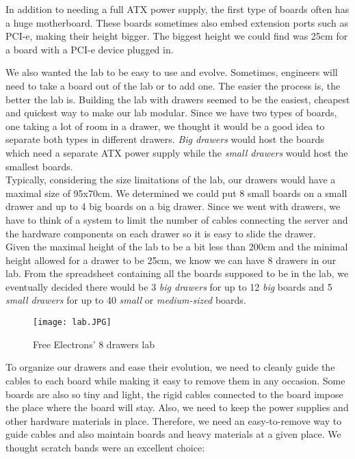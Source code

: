 In addition to needing a full ATX power supply, the first type of boards often has a huge motherboard. These boards sometimes also embed extension ports such as PCI-e, making their height bigger. The biggest height we could find was 25cm for a board with a PCI-e device plugged in.

We also wanted the lab to be easy to use and evolve. Sometimes, engineers will need to take a board out of the lab or to add one. The easier the process is, the better the lab is. Building the lab with drawers seemed to be the easiest, cheapest and quickest way to make our lab modular. Since we have two types of boards, one taking a lot of room in a drawer, we thought it would be a good idea to separate both types in different drawers. \textit{Big drawers} would host the boards which need a separate ATX power supply while the \textit{small drawers} would host the smallest boards.\\
Typically, considering the size limitations of the lab, our drawers would have a maximal size of 95x70cm. We determined we could put 8 small boards on a small drawer and up to 4 big boards on a big drawer. Since we went with drawers, we have to think of a system to limit the number of cables connecting the server and the hardware components on each drawer so it is easy to slide the drawer.\\
Given the maximal height of the lab to be a bit less than 200cm and the minimal height allowed for a drawer to be 25cm, we know we can have 8 drawers in our lab. From the spreadsheet containing all the boards supposed to be in the lab, we eventually decided there would be 3 \textit{big drawers} for up to 12 \textit{big} boards and 5 \textit{small drawers} for up to 40 \textit{small} or \textit{medium-sized} boards.

\begin{figure}
  \centering
  \texttt{[image: lab.JPG]}
  \caption{Free Electrons' 8 drawers lab}
\end{figure}

To organize our drawers and ease their evolution, we need to cleanly guide the cables to each board while making it easy to remove them in any occasion. Some boards are also so tiny and light, the rigid cables connected to the board impose the place where the board will stay. Also, we need to keep the power supplies and other hardware materials in place. Therefore, we need an easy-to-remove way to guide cables and also maintain boards and heavy materials at a given place. We thought scratch bands were an excellent choice:

